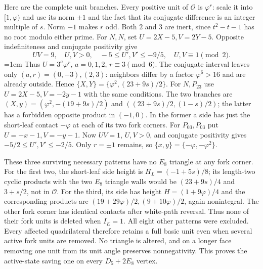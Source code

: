 \documentclass[11pt]{article}
\begin{document}
Here are the complete unit branches. Every positive unit of
$\mathcal O$ is $\varphi^r$: scale it into $[1,\varphi)$ and use
its norm $\pm1$ and the fact that its conjugate difference is an
integer multiple of $s$. Norm $-1$ makes $r$ odd. Both $2$ and $3$
are inert, since $t^2-t-1$ has no root modulo either prime.
For $N,N$, set $U=2X-5,V=2Y-5$. Opposite indefiniteness and conjugate
positivity give
\[
 UV=9,\quad U,V>0,\quad -5\le U',V'\le-9/5,\quad U,V\equiv1\pmod2.
\]
\begingroup
\emergencystretch=1em
Thus $U=3^a\varphi^r$, $a=0,1,2$, $r\equiv3\pmod6$.
The conjugate interval leaves only $(a,r)=(0,-3),(2,3)$:
neighbors differ by a factor $\varphi^6>16$ and are already outside.
Hence $\{X,Y\}=\{\varphi^2,(23+9s)/2\}$.
For $N,P_{23}$ use $U=2X-5,V=-2y-1$ with the same conditions.
The two branches are
$(X,y)=(\varphi^2,-(19+9s)/2)$ and
$((23+9s)/2,(1-s)/2)$; the latter has a forbidden opposite product
in $(-1,0)$. In the former a side has just the short-leaf contact
$-\varphi$ at each of its two fork corners.
For $P_{03},P_{03}$ put $U=-x-1,V=-y-1$.
Now $UV=1$, $U,V>0$, and conjugate positivity gives
$-5/2\le U',V'\le-2/5$. Only $r=\pm1$ remains, so
$\{x,y\}=\{-\varphi,-\varphi^2\}$.
\par
\endgroup

These three surviving necessary patterns have no $E_8$ triangle
at any fork corner. For the first two, the short-leaf side height
is $H_L=(-1+5s)/8$; its length-two cyclic products with the two
$E_8$ triangle walls would be $(23+9s)/4$ and $3+s/2$, not in
$\mathcal O$. For the third, its side has height
$H=(1+9\varphi)/4$ and the corresponding products are
$(19+29\varphi)/2,(9+10\varphi)/2$, again nonintegral.
The other fork corner has identical contacts after white-path reversal.
Thus none of their fork units is deleted when $I_E=1$.
All eight other patterns were excluded. Every affected quadrilateral
therefore retains a full basic unit even when several active fork
units are removed. No triangle is altered, and on a longer face
removing one unit from its unit angle preserves nonnegativity.
This proves the active-state saving one on every $D_5+2E_8$ vertex.
\end{document}
